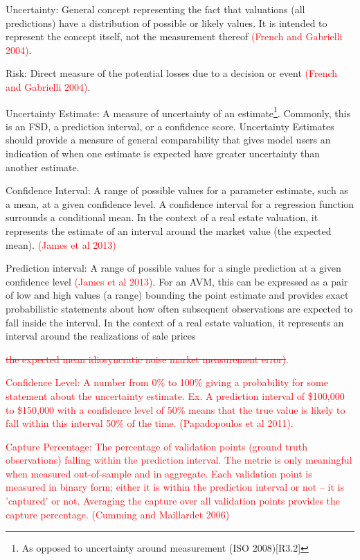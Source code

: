 \documentclass[colTwo]{anon}
\theoremstyle{definition}
\begin{document}
\begin{itemize}
\item Uncertainty: General concept representing the fact that valuations (all predictions) have a distribution of possible or likely values.  It is intended to represent the concept itself, not the measurement thereof \textcolor{red}{(French and Gabrielli 2004)}. 
\item Risk: Direct measure of the potential losses due to a decision or event \textcolor{red}{(French and Gabrielli 2004)}.
\item Uncertainty Estimate: A measure of uncertainty of an estimate\footnote{As opposed to uncertainty around measurement (ISO 2008)[R3.2]}. Commonly, this is an FSD, a prediction interval, or a confidence score. Uncertainty Estimates should provide a measure of general comparability that gives model users an indication of when one estimate is expected have greater uncertainty than another estimate.
\item Confidence Interval: A range of possible values for a parameter estimate, such as a mean, at a given confidence level. A confidence interval for a regression function surrounds a conditional mean. In the context of a real estate valuation, it represents the estimate of an interval around the market value (the expected mean). \textcolor{red}{(James et al 2013)}
\item Prediction interval: A range of possible values for a single prediction at a given confidence level \textcolor{red}{(James et al 2013)}. For an AVM, this can be expressed as a pair of low and high values (a range) bounding the point estimate and provides exact probabilistic statements about how often subsequent observations are expected to fall inside the interval. In the context of a real estate valuation, it represents an interval around the realizations of sale prices \textcolor{red}{\st{the expected mean \plus idiosyncratic noise \plus market measurement error)}. 
\item Confidence Level: A number from 0\% to 100\% giving a probability for some statement about the uncertainty estimate. \textcolor{red}{Ex. A prediction interval of \$100,000 to \$150,000 with a confidence level of 50\% means that the true value is likely to fall within this interval 50\% of the time. (Papadopoulos et al 2011).}
\item Capture Percentage: The percentage of validation points (ground truth observations) falling within the prediction interval. The metric is only meaningful when measured out-of-sample and in aggregate. Each validation point is measured in binary form; either it is within the prediction interval or not -- it is 'captured' or not. Averaging the capture over all validation points provides the capture percentage. \textcolor{red}{(Cumming and Maillardet 2006)}
}
\end{itemize}
\end{document}
